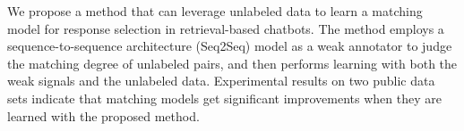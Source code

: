 We propose a method that can leverage unlabeled data to learn a matching model for response selection in retrieval-based chatbots. The method employs a sequence-to-sequence architecture (Seq2Seq) model as a weak annotator to judge the matching degree of unlabeled pairs, and then performs learning with both the weak signals and the unlabeled data. Experimental results on two public data sets indicate that matching models get significant improvements when they are learned with the proposed method.
